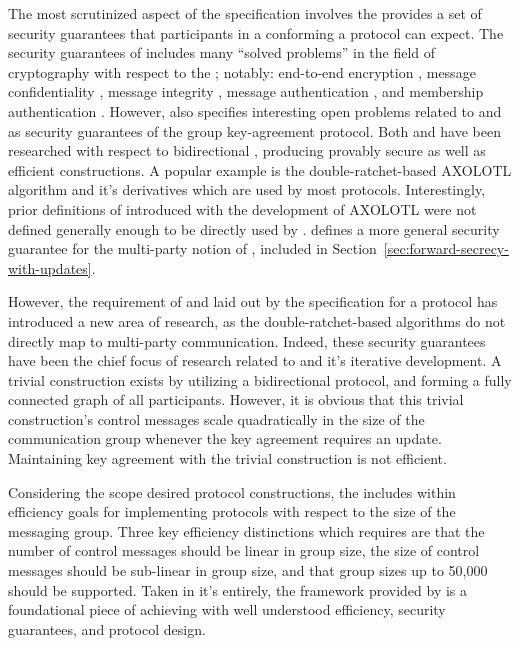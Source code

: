The most scrutinized aspect of the  specification involves the provides a set of security guarantees that participants in a conforming a protocol can expect.
The security guarantees of  includes many ``solved problems'' in the field of cryptography with respect to the ; notably: end-to-end encryption \autocite{padlipsky1978limitations}, message confidentiality \autocite{17715}, message integrity \autocite{voydock1983security}, message authentication \autocite{jueneman1983message}, and membership authentication \autocite{chaum1985showing}.
However,  also specifies interesting open problems related to  \autocite{gunther1989identity} and  \autocite{cohn2016post} as security guarantees of the group key-agreement protocol.
Both  and  have been researched with respect to bidirectional , producing provably secure as well as efficient constructions.
A popular example is the double-ratchet-based AXOLOTL algorithm \autocite{perrin2014axolotl} and it's derivatives which are used by most  protocols.
Interestingly, prior definitions of  introduced with the development of AXOLOTL were not defined generally enough to be directly used by .
 defines a more general security guarantee for the multi-party notion of , included in Section\ \ref{sec:forward-secrecy-with-updates}.

However, the requirement of  and  laid out by the  specification for a  protocol has introduced a new area of research, as the double-ratchet-based algorithms do not directly map to multi-party communication.
Indeed, these  security guarantees have been the chief focus of research related to  and it's iterative development.
A trivial construction exists by utilizing a bidirectional  protocol, and forming a fully connected graph of all  participants.
However, it is obvious that this trivial construction's control messages scale quadratically in the size of the communication group whenever the key agreement requires an update.
Maintaining key agreement with the trivial construction is not efficient.

Considering the scope desired protocol constructions, the  includes within  efficiency goals \autocite{ietf-mls-architecture-07} for implementing protocols with respect to the size of the messaging group.
Three key efficiency distinctions which  requires are that the number of control messages should be linear in group size, the size of control messages should be sub-linear in group size, and that group sizes up to 50,000 should be supported.
Taken in it's entirely, the framework provided by  is a foundational piece of achieving  with well understood efficiency, security guarantees, and protocol design.


